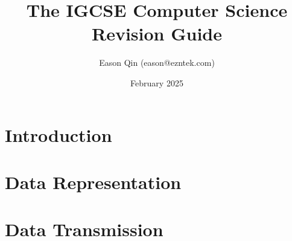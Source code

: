 \documentclass[a4paper, oneside, 11pt]{book} %
\title{The IGCSE Computer Science Revision Guide}
\author{Eason Qin (eason@ezntek.com)}
\date{February 2025}
\begin{document}
\maketitle
\label{table-of-contents}
\tableofcontents

\chapter*{Introduction}
\label{introduction}


\chapter{Data Representation}


\chapter{Data Transmission}

\end{document}
